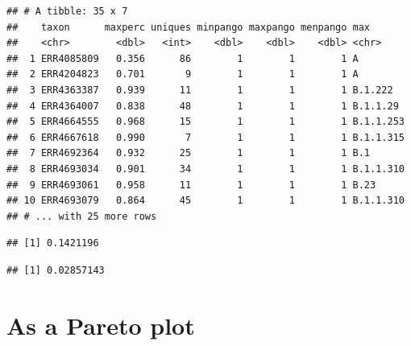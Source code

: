 \documentclass[]{article}
\newenvironment{Shaded}{\begin{snugshade}}{\end{snugshade}}
\newcommand{\DecValTok}[1]{\textcolor[rgb]{0.00,0.00,0.81}{#1}}
\newcommand{\KeywordTok}[1]{\textcolor[rgb]{0.13,0.29,0.53}{\textbf{#1}}}
\newcommand{\NormalTok}[1]{#1}
\newcommand{\OperatorTok}[1]{\textcolor[rgb]{0.81,0.36,0.00}{\textbf{#1}}}
\newcommand{\StringTok}[1]{\textcolor[rgb]{0.31,0.60,0.02}{#1}}
\begin{document}
\begin{verbatim}
## # A tibble: 35 x 7
##    taxon      maxperc uniques minpango maxpango menpango max      
##    <chr>        <dbl>   <int>    <dbl>    <dbl>    <dbl> <chr>    
##  1 ERR4085809   0.356      86        1        1        1 A        
##  2 ERR4204823   0.701       9        1        1        1 A        
##  3 ERR4363387   0.939      11        1        1        1 B.1.222  
##  4 ERR4364007   0.838      48        1        1        1 B.1.1.29 
##  5 ERR4664555   0.968      15        1        1        1 B.1.1.253
##  6 ERR4667618   0.990       7        1        1        1 B.1.1.315
##  7 ERR4692364   0.932      25        1        1        1 B.1      
##  8 ERR4693034   0.901      34        1        1        1 B.1.1.310
##  9 ERR4693061   0.958      11        1        1        1 B.23     
## 10 ERR4693079   0.864      45        1        1        1 B.1.1.310
## # ... with 25 more rows
\end{verbatim}

\begin{Shaded}
\end{Shaded}

\begin{verbatim}
## [1] 0.1421196
\end{verbatim}

\begin{verbatim}
## [1] 0.02857143
\end{verbatim}

\hypertarget{as-a-pareto-plot}{%
\section{As a Pareto plot}\label{as-a-pareto-plot}}
\end{document}
